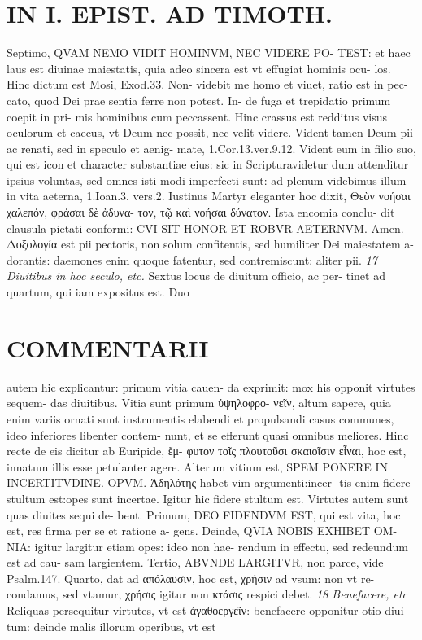 \documentclass{article}
\begin{document}
\begin{pages}
\section*{IN I. EPIST. AD TIMOTH. }
\marginpar{[ p.167 ]}\pstart Septimo, QVAM NEMO VIDIT HOMINVM, NEC VIDERE PO- TEST: et haec laus est diuinae maiestatis, quia adeo sincera est vt effugiat hominis ocu- los. Hinc dictum est Mosi, Exod.33. Non- videbit me homo et viuet, ratio est in pec- cato, quod Dei prae sentia ferre non potest. In- de fuga et trepidatio primum coepit in pri- mis hominibus cum peccassent. Hinc crassus est redditus visus oculorum et caecus, vt Deum nec possit, nec velit videre. Vident tamen Deum pii ac renati, sed in speculo et aenig- mate, 1.Cor.13.ver.9.12. Vident eum in filio suo, qui est icon et character substantiae eius: sic in Scripturavidetur dum attenditur ipsius voluntas, sed omnes isti modi imperfecti sunt: ad plenum videbimus illum in vita aeterna, 1.Ioan.3. vers.2. Iustinus Martyr eleganter hoc dixit, Θεὸν νοήσαι χαλεπόν, φράσαι δὲ ἀδυνα- τον, τῷ καὶ νοήσαι δύνατον. Ista encomia conclu- dit clausula pietati conformi: CVI SIT HONOR ET ROBVR AETERNVM. Amen. Δοξολογία est pii pectoris, non solum confitentis, sed humiliter Dei maiestatem a- dorantis: daemones enim quoque fatentur, sed contremiscunt: aliter pii.  \pend
\textit{17 Diuitibus in hoc seculo, etc. }\pstart Sextus locus de diuitum officio, ac per- tinet ad quartum, qui iam expositus est. Duo  \pend
\marginpar{[ p.168 ]}
\section*{COMMENTARII }\pstart autem hic explicantur: primum vitia cauen- da exprimit: mox his opponit virtutes sequem- das diuitibus. Vitia sunt primum ὑψηλοφρο- νεῖν, altum sapere, quia enim variis ornati sunt instrumentis elabendi et propulsandi casus communes, ideo inferiores libenter contem- nunt, et se efferunt quasi omnibus meliores.  \pend\pstart Hinc recte de eis dicitur ab Euripide, ἔμ- φυτον τοῖς πλουτοῦσι σκαιοῖσιν εἶναι, hoc est, innatum illis esse petulanter agere. Alterum vitium est, SPEM PONERE IN INCERTITVDINE. OPVM. Ἀδηλότης  habet vim argumenti:incer- tis enim fidere stultum est:opes sunt incertae. Igitur hic fidere stultum est.  \pend\pstart Virtutes autem sunt quas diuites sequi de- bent. Primum, DEO FIDENDVM EST, qui est vita, hoc est, res firma per se et ratione a- gens. Deinde, QVIA NOBIS EXHIBET OM- NIA: igitur largitur etiam opes: ideo non hae- rendum in effectu, sed redeundum est ad cau- sam largientem. Tertio, ABVNDE LARGITVR, non parce, vide Psalm.147. Quarto, dat ad απόλαυσιν, hoc est, χρήσιν ad vsum: non vt re- condamus, sed vtamur, χρήσις igitur non κτάσις respici debet.  \pend
\textit{18 Benefacere, etc }\pstart Reliquas persequitur virtutes, vt est ἀγαθοεργεῖν: benefacere opponitur otio diui- tum: deinde malis illorum operibus, vt est  \pend

\end{pages}
\end{document}
